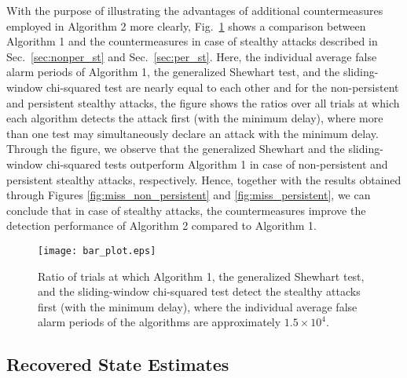 \documentclass[onecolumn]{IEEEtran}
\begin{document}
With the purpose of illustrating the advantages of additional countermeasures employed in Algorithm 2 more clearly, Fig.~\ref{fig:bar_plot} shows a comparison between Algorithm 1 and the countermeasures in case of stealthy attacks described in Sec.~\ref{sec:nonper_st} and Sec.~\ref{sec:per_st}. Here, the individual average false alarm periods of Algorithm 1, the generalized Shewhart test, and the sliding-window chi-squared test are nearly equal to each other and for the non-persistent and persistent stealthy attacks, the figure shows the ratios over all trials at which each algorithm detects the attack first (with the minimum delay), where more than one test may simultaneously declare an attack with the minimum delay. Through the figure, we observe that the generalized Shewhart and the sliding-window chi-squared tests outperform Algorithm 1 in case of non-persistent and persistent stealthy attacks, respectively. Hence, together with the results obtained through Figures \ref{fig:miss_non_persistent} and \ref{fig:miss_persistent}, we can conclude that in case of stealthy attacks, the countermeasures improve the detection performance of Algorithm 2 compared to Algorithm 1.

\begin{figure}
\center
  \texttt{[image: bar\_plot.eps]}
\caption{Ratio of trials at which Algorithm 1, the generalized Shewhart test, and the sliding-window chi-squared test detect the stealthy attacks first (with the minimum delay), where the individual average false alarm periods of the algorithms are approximately $1.5\times10^{4}$.}
 \label{fig:bar_plot}
\end{figure}


\subsection{Recovered State Estimates}
\end{document}
